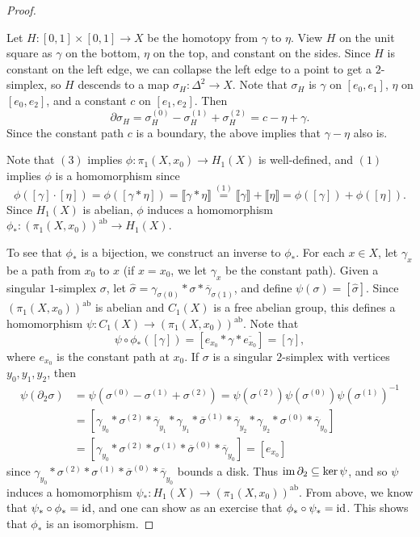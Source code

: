 \begin{proof}
\begin{enumerate}
      Let $H : [0, 1] \times [0, 1] \to X$ be the
      homotopy from $\gamma$ to $\eta$. View
      $H$ on the unit square as $\gamma$ on the
      bottom, $\eta$ on the top, and constant
      on the sides. Since $H$ is constant on the
      left edge, we can collapse the left edge to a
      point to get a $2$-simplex, so $H$ descends to
      a map $\sigma_H : \Delta^2 \to X$. Note that
      $\sigma_H$ is $\gamma$ on $[e_0, e_1]$,
      $\eta$ on $[e_0, e_2]$, and a constant $c$
      on $[e_1, e_2]$. Then
      \[
        \partial \sigma_H = \sigma_H^{(0)} - \sigma_H^{(1)} + \sigma_H^{(2)}
        = c - \eta + \gamma.
      \]
      Since the constant path $c$ is a boundary,
      the above implies that $\gamma - \eta$ also is.
  \end{enumerate}
  Note that $(3)$ implies
  $\phi : \pi_1(X, x_0) \to H_1(X)$ is well-defined, and
  $(1)$ implies $\phi$ is a homomorphism
  since
  \[
    \phi([\gamma] \cdot [\eta])
    = \phi([\gamma * \eta])
    = \llbracket \gamma * \eta \rrbracket
    \overset{(1)}{=} \llbracket \gamma \rrbracket + \llbracket \eta \rrbracket
    = \phi([\gamma]) + \phi([\eta]).
  \]
  Since $H_1(X)$ is abelian, $\phi$ induces
  a homomorphism
  $\phi_* : (\pi_1(X, x_0))^{\mathrm{ab}} \to H_1(X)$.

  To see that $\phi_*$ is a bijection, we construct
  an inverse to $\phi_*$. For each $x \in X$, let
  $\gamma_x$ be a path from $x_0$ to $x$ (if $x = x_0$,
  we let $\gamma_x$ be the constant path). Given a
  singular $1$-simplex $\sigma$, let
  $\widehat{\sigma} = \gamma_{\sigma(0)} * \sigma * \overline{\gamma}_{\sigma(1)}$, and
  define $\psi(\sigma) = [\widehat{\sigma}]$.
  Since $(\pi_1(X, x_0))^{\mathrm{ab}}$ is abelian
  and $C_1(X)$ is a free abelian group, this defines
  a homomorphism $\psi : C_1(X) \to (\pi_1(X, x_0))^{\mathrm{ab}}$. Note that
  \[
    \psi \circ \phi_*([\gamma]) = [e_{x_0} * \gamma * \overline{e_{x_0}}] = [\gamma],
  \]
  where $e_{x_0}$ is the constant path at $x_0$.
  If $\sigma$ is a singular $2$-simplex with vertices
  $y_0, y_1, y_2$, then
  \begin{align*}
    \psi(\partial_2 \sigma)
    &= \psi(\sigma^{(0)} - \sigma^{(1)} + \sigma^{(2)})
    = \psi(\sigma^{(2)}) \psi(\sigma^{(0)}) \psi(\sigma^{(1)})^{-1} \\
    &= [\gamma_{y_0} * \sigma^{(2)} * \overline{\gamma}_{y_1} * \gamma_{y_1} * \overline{\sigma}^{(1)} * \overline{\gamma}_{y_2} * \gamma_{y_2} * \sigma^{(0)} * \overline{\gamma}_{y_0}] \\
    &= [\gamma_{y_0} * \sigma^{(2)} * \sigma^{(1)} * \overline{\sigma}^{(0)} * \overline{\gamma}_{y_0}]
    = [e_{x_0}]
  \end{align*}
  since $\gamma_{y_0} * \sigma^{(2)} * \sigma^{(1)} * \overline{\sigma}^{(0)} * \overline{\gamma}_{y_0}$
  bounds a disk. Thus $\operatorname{im} \partial_2 \subseteq \ker \psi$,
  and so $\psi$ induces a homomorphism
  $\psi_* : H_1(X) \to (\pi_1(X, x_0))^{\mathrm{ab}}$.
  From above, we know that $\psi_* \circ \phi_* = \operatorname{id}$,
  and one can show as an exercise that
  $\phi_* \circ \psi_* = \operatorname{id}$. This shows that
  $\phi_*$ is an isomorphism.
\end{proof}
